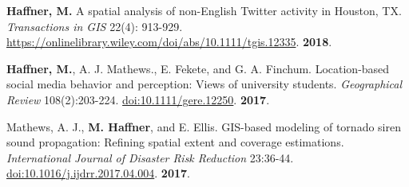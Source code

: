 \begin{cventries}
   \cventry
      {}
      {}
      {}
      {}
      {
        \begin{cvitems}
          \vspace{-4mm}
        \item {\textbf{Haffner, M.} A spatial analysis of non-English Twitter
            activity in Houston, TX. \textit{Transactions in GIS} 22(4):
            913-929. \href{https://onlinelibrary.wiley.com/doi/abs/10.1111/tgis.12335}{https://onlinelibrary.wiley.com/doi/abs/10.1111/tgis.12335}.}
            \textbf{2018}. \\
          \vspace{-2mm}
        \end{cvitems}
    }

   \cventry
      {}
      {}
      {}
      {}
      {
        \begin{cvitems}
          \vspace{-4mm} \item {\textbf{Haffner, M.}, A. J. Mathews., E. Fekete, and
            G. A. Finchum. Location-based social media behavior and perception:
            Views of university students. \textit{Geographical Review} 108(2):203-224.
            \href{http://onlinelibrary.wiley.com/doi/10.1111/gere.12250/abstract}{doi:10.1111/gere.12250}.}
          \textbf{2017}.
          \\
          \vspace{-2mm}
        \end{cvitems}
    } %

   \cventry
      {}
      {}
      {}
      {}
      {
        \begin{cvitems}
          \vspace{-4mm}
        \item {Mathews, A. J., \textbf{M. Haffner}, and E. Ellis. GIS-based modeling
            of tornado siren sound propagation: Refining spatial extent and
            coverage estimations. \textit{International Journal of Disaster Risk
              Reduction} 23:36-44.
            \href{https://doi.org/10.1016/j.ijdrr.2017.04.004}{doi:10.1016/j.ijdrr.2017.04.004}.}
          \textbf{2017}.\\
          \vspace{-2mm}
        \end{cvitems}
    }

\end{cventries}


